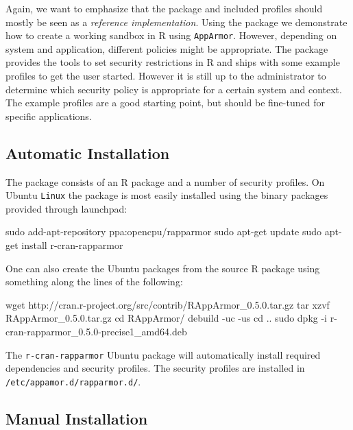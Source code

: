 \documentclass[article]{jss}
\newcommand{\R}{\textsf{R}\xspace}
\newcommand{\AppArmor}{\texttt{AppArmor}\xspace}
\newcommand{\RAppArmor}{\pkg{RAppArmor}\xspace}
\newcommand{\Linux}{\texttt{Linux}\xspace}
\begin{document}
Again, we want to emphasize that the package and included profiles should mostly
be seen as a \emph{reference implementation}. Using the package we demonstrate
how to create a working sandbox in \R using \AppArmor. However, depending on
system and application, different policies might be appropriate. The \RAppArmor
package provides the tools to set security restrictions in \R and ships with
some example profiles to get the user started. However it is still up to the
administrator to determine which security policy is appropriate for a certain
system and context. The example profiles are a good starting point, but should
be fine-tuned for specific applications.

\subsection{Automatic Installation}

The \RAppArmor package consists of an \R package and a number of security
profiles. On Ubuntu \Linux the package is most easily installed using the binary
packages provided through launchpad:

\begin{CodeChunk}
\begin{CodeInput}
sudo add-apt-repository ppa:opencpu/rapparmor
sudo apt-get update
sudo apt-get install r-cran-rapparmor
\end{CodeInput}
\end{CodeChunk}

One can also create the Ubuntu packages from the source \R package
using something along the lines of the following:

\begin{CodeChunk}
\begin{CodeInput}
wget http://cran.r-project.org/src/contrib/RAppArmor_0.5.0.tar.gz
tar xzvf RAppArmor_0.5.0.tar.gz
cd RAppArmor/
debuild -uc -us
cd ..
sudo dpkg -i r-cran-rapparmor_0.5.0-precise1_amd64.deb
\end{CodeInput}
\end{CodeChunk}

The \texttt{r-cran-rapparmor} Ubuntu package will automatically install required
dependencies and security profiles. The security profiles are installed in
\texttt{/etc/appamor.d/rapparmor.d/}.

\subsection{Manual Installation}
\end{document}
